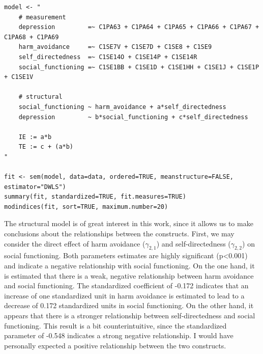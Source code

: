 \documentclass[11pt]{article}
\begin{document}
\begin{minipage}{\linewidth}
\begin{lstlisting}
model <- "
    # measurement
    depression         =~ C1PA63 + C1PA64 + C1PA65 + C1PA66 + C1PA67 + C1PA68 + C1PA69
    harm_avoidance     =~ C1SE7V + C1SE7D + C1SE8 + C1SE9
    self_directedness  =~ C1SE14O + C1SE14P + C1SE14R
    social_functioning =~ C1SE1BB + C1SE1D + C1SE1HH + C1SE1J + C1SE1P + C1SE1V

    # structural
    social_functioning ~ harm_avoidance + a*self_directedness
    depression         ~ b*social_functioning + c*self_directedness
    
    IE := a*b
    TE := c + (a*b) 
"

fit <- sem(model, data=data, ordered=TRUE, meanstructure=FALSE, estimator="DWLS")
summary(fit, standardized=TRUE, fit.measures=TRUE)
modindices(fit, sort=TRUE, maximum.number=20)
\end{lstlisting}
\end{minipage}

The structural model is of great interest in this work, since it allows us
to make conclusions about the relationships between the constructs.
First, we may consider the direct effect of harm avoidance ($\gamma_{2,1}$) and
self-directedness ($\gamma_{2,2}$) on social functioning. Both parameters
estimates are highly significant (p<0.001) and indicate a negative relationship
with social functioning. On the one hand, it is estimated that there is a weak,
negative relationship between harm avoidance and social functioning. The
standardized coefficient of -0.172 indicates that an increase of one
standardized unit in harm avoidance is estimated to lead to a decrease of 0.172
standardized units in social functioning. On the other hand, it appears that
there is a stronger relationship between self-directedness and social
functioning. This result is a bit counterintuitive, since the standardized
parameter of -0.548 indicates a strong negative relationship. I would have
personally expected a positive relationship between the two constructs.
\end{document}
